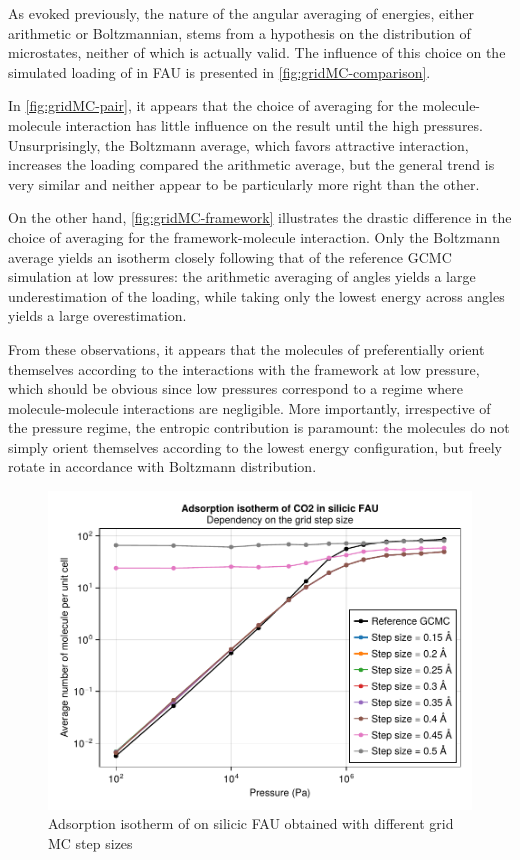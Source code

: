 \documentclass[main.tex]{subfiles}
\begin{document}
As evoked previously, the nature of the angular averaging of energies, either arithmetic or Boltzmannian, stems from a hypothesis on the distribution of microstates, neither of which is actually valid. The influence of this choice on the simulated loading of  in FAU is presented in \cref{fig:gridMC-comparison}.

In \cref{fig:gridMC-pair}, it appears that the choice of averaging for the molecule-molecule interaction has little influence on the result until the high pressures. Unsurprisingly, the Boltzmann average, which favors attractive interaction, increases the loading compared the arithmetic average, but the general trend is very similar and neither appear to be particularly more right than the other.

On the other hand, \cref{fig:gridMC-framework} illustrates the drastic difference in the choice of averaging for the framework-molecule interaction. Only the Boltzmann average yields an isotherm closely following that of the reference GCMC simulation at low pressures: the arithmetic averaging of angles yields a large underestimation of the loading, while taking only the lowest energy across angles yields a large overestimation.

From these observations, it appears that the molecules of  preferentially orient themselves according to the interactions with the framework at low pressure, which should be obvious since low pressures correspond to a regime where molecule-molecule interactions are negligible. More importantly, irrespective of the pressure regime, the entropic contribution is paramount: the molecules do not simply orient themselves according to the lowest energy configuration, but freely rotate in accordance with Boltzmann distribution.

\begin{figure}
	\centering
	\includegraphics[width=0.8\columnwidth]{figures/gcmc/gridmc_CO2_FAU_comparison_size.pdf}
	\caption{Adsorption isotherm of  on silicic FAU obtained with different grid MC step sizes}\label{fig:gridMC-sizes}
\end{figure}
\end{document}
